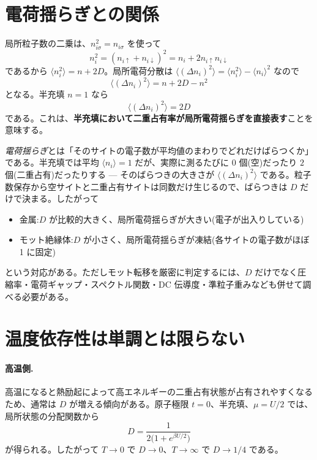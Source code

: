 \documentclass[11pt,a4paper]{ltjsarticle}
\newcommand{\ev}[1]{\langle #1\rangle}
\newcommand{\up}{\uparrow}
\newcommand{\dn}{\downarrow}
\begin{document}
\section{電荷揺らぎとの関係}
\label{sec:charge}

局所粒子数の二乗は、$n_{i\sigma}^2=n_{i\sigma}$ を使って
\begin{equation}
  n_i^2 = (n_{i\up}+n_{i\dn})^2 = n_i + 2n_{i\up}n_{i\dn}
\end{equation}
であるから $\ev{n_i^2}=n+2D$。局所電荷分散は $\ev{(\Delta n_i)^2}=\ev{n_i^2}-\ev{n_i}^2$ なので
\begin{equation}
  \boxed{\ \ev{(\Delta n_i)^2} = n + 2D - n^2\ }
\end{equation}
となる。半充填 $n=1$ なら
\begin{equation}
  \boxed{\ \ev{(\Delta n_i)^2} = 2D\ }
\end{equation}
である。これは、\textbf{半充填において二重占有率が局所電荷揺らぎを直接表す}ことを意味する。

\emph{電荷揺らぎ}とは「そのサイトの電子数が平均値のまわりでどれだけばらつくか」である。半充填では平均 $\ev{n_i}=1$ だが、実際に測るたびに $0$ 個(空)だったり $2$ 個(二重占有)だったりする — そのばらつきの大きさが $\ev{(\Delta n_i)^2}$ である。粒子数保存から空サイトと二重占有サイトは同数だけ生じるので、ばらつきは $D$ だけで決まる。したがって
\begin{itemize}
  \item 金属:$D$ が比較的大きく、局所電荷揺らぎが大きい(電子が出入りしている)
  \item モット絶縁体:$D$ が小さく、局所電荷揺らぎが凍結(各サイトの電子数がほぼ 1 に固定)
\end{itemize}
という対応がある。ただしモット転移を厳密に判定するには、$D$ だけでなく圧縮率・電荷ギャップ・スペクトル関数・DC 伝導度・準粒子重みなども併せて調べる必要がある。

\section{温度依存性は単調とは限らない}

\paragraph{高温側.}高温になると熱励起によって高エネルギーの二重占有状態が占有されやすくなるため、通常は $D$ が増える傾向がある。原子極限 $t=0$、半充填、$\mu=U/2$ では、局所状態の分配関数から
\begin{equation}
  D = \frac{1}{2\bigl(1+e^{\beta U/2}\bigr)}
\end{equation}
が得られる。したがって $T\to0$ で $D\to0$、$T\to\infty$ で $D\to1/4$ である。
\end{document}
